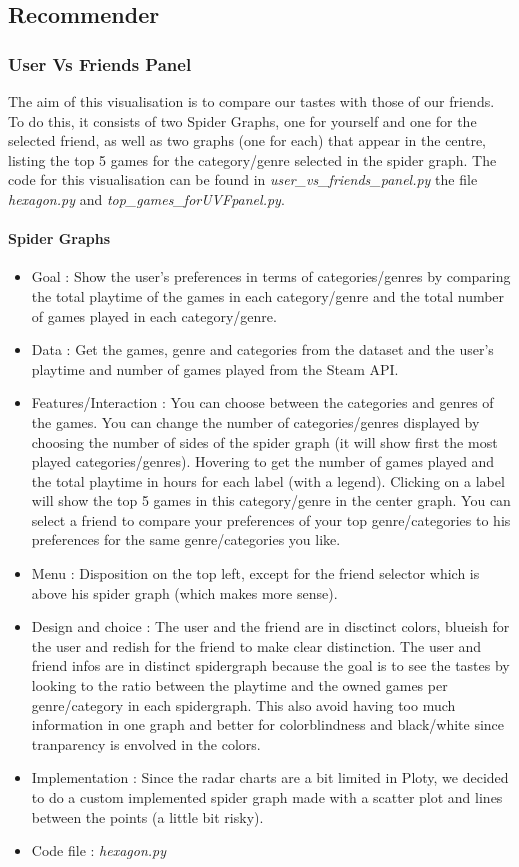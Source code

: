 \documentclass{article}
\begin{document}
	\subsection{Recommender}
    
	\subsubsection{User Vs Friends Panel}
	The aim of this visualisation is to compare our tastes with those of our friends. To do this, it consists of two Spider Graphs, one for yourself and one for the selected friend, as well as two graphs (one for each) that appear in the centre, listing the top 5 games for the category/genre selected in the spider graph. The code for this visualisation can be found in \textit{user\_vs\_friends\_panel.py} the file \textit{hexagon.py} and \textit{top\_games\_forUVFpanel.py}.

	\paragraph{Spider Graphs}
	\begin{itemize}
		\item Goal : Show the user's preferences in terms of categories/genres by comparing the total playtime of the games in each category/genre and the total number of games played in each category/genre.
		\item Data : Get the games, genre and categories from the dataset and the user's playtime and number of games played from the Steam API.
		\item Features/Interaction : You can choose between the categories and genres of the games. You can change the number of categories/genres displayed by choosing the number of sides of the spider graph (it will show first the most played categories/genres). Hovering to get the number of games played and the total playtime in hours for each label (with a legend). Clicking on a label will show the top 5 games in this category/genre in the center graph. You can select a friend to compare your preferences of your top genre/categories to his preferences for the same genre/categories you like.
		\item Menu : Disposition on the top left, except for the friend selector which is above his spider graph (which makes more sense).
		\item Design and choice : The user and the friend are in disctinct colors, blueish for the user and redish for the friend to make clear distinction. The user and friend infos are in distinct spidergraph because the goal is to see the tastes by looking to the ratio between the playtime and the owned games per genre/category in each spidergraph. This also avoid having too much information in one graph and better for colorblindness and black/white since tranparency is envolved in the colors.
		\item Implementation : Since the radar charts are a bit limited in Ploty, we decided to do a custom implemented spider graph made with a scatter plot and lines between the points (a little bit risky).
		\item Code file : \textit{hexagon.py}
	\end{itemize}
\end{document}
